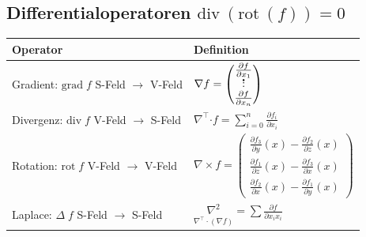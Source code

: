 \documentclass[6pt,a4paper]{scrartcl}
\let\olddot = \dot
\newcommand{\vect}[1]{\ensuremath{\begin{pmatrix} #1 \end{pmatrix}}}							%
\newcommand{\bdot}{\ensuremath{\boldsymbol \cdot}} 												%
\newcommand{\svdots}{\ensuremath{\olddot :}}													%
\renewcommand*{\dot}[1]{\accentset{\mbox{\textrm{\large\bfseries .}} }{#1}}						%
\renewcommand{\div}{\ensuremath{\mathrm{div}\ }}								%
\newcommand{\rot}{\ensuremath{\mathrm{rot}\ }}									%
\begin{document}
\begin{multicols}{4}
\subsection{Differentialoperatoren \qquad $\div(\rot(f)) = 0$}
\begin{tabular}{l|l}
	Operator & Definition \\ \midrule
	\pbox{2.0cm}{ Gradient: $\mathrm{grad}\; f$ \\ S-Feld $\rightarrow$ V-Feld } & $\nabla f = \vect{\frac{\partial f}{\partial x_1} \\ \svdots \\ \frac{\partial f}{\partial x_n} }$ \\ \midrule
	\pbox{2.0cm}{ Divergenz: $\mathrm{div}\; f$ \\ V-Feld $\rightarrow$ S-Feld } & ${\displaystyle \nabla^\top \bdot f = \sum\limits_{i=0}^n \frac{\partial f_i}{\partial x_i}}$\\ \midrule %
	\pbox{2.0cm}{ Rotation: $\mathrm{rot}\; f$ \\ V-Feld $\rightarrow$ V-Feld } & $\nabla \times f = \vect{\frac{\partial f_3}{\partial y}(x) - \frac{\partial f_2}{\partial z}(x) \\[2pt] \frac{\partial f_1}{\partial z}(x) -\frac{\partial f_3}{\partial x}(x) \\[2pt] \frac{\partial f_2}{\partial x}(x) -\frac{\partial f_1}{\partial y}(x) }$ \\ \midrule
	\pbox{2.0cm}{ Laplace: $\Delta\; f$ \\ S-Feld $\rightarrow$ S-Feld } & ${\displaystyle\underset{\nabla^\top \cdot (\nabla f)}{\nabla^2} = \sum \frac{\partial f}{\partial x_i x_i} }$ %
\end{tabular}



\end{multicols}
\end{document}
